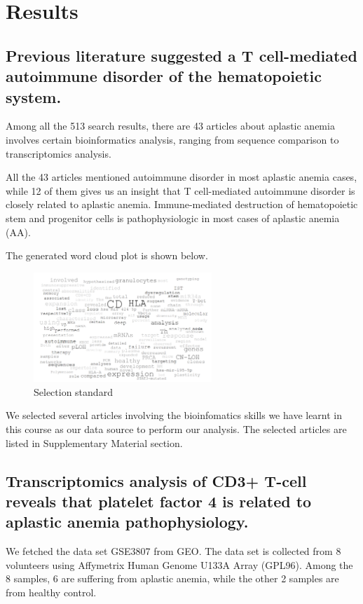 \section{Results}

\subsection{Previous literature suggested a T cell-mediated autoimmune disorder of the hematopoietic system.}

Among all the 513 search results, there are 43 articles about aplastic anemia involves certain bioinformatics analysis, ranging from sequence comparison to transcriptomics analysis. 

All the 43 articles mentioned autoimmune disorder in most aplastic anemia cases, while 12 of them gives us an insight that T cell-mediated autoimmune disorder is closely related to aplastic anemia. Immune-mediated destruction of hematopoietic stem and progenitor cells is pathophysiologic in most cases of aplastic anemia (AA).\cite{zeng2004transcript}

The generated word cloud plot is shown below.

\begin{figure}[H]
    \centering
    \includegraphics[width=0.6\textwidth]{image/wordcloud.png}
    \caption{Selection standard}
    \label{WORD}
\end{figure}

We selected several articles involving the bioinfomatics skills we have learnt in this course as our data source to perform our analysis. The selected articles are listed in Supplementary Material section.


\subsection{Transcriptomics analysis of CD3+ T-cell reveals that platelet factor 4 is related to aplastic anemia pathophysiology.}

We fetched the data set GSE3807 from GEO. The data set is collected from 8 volunteers using Affymetrix Human Genome U133A Array (GPL96). Among the 8 samples, 6 are suffering from aplastic anemia, while the other 2 samples are from healthy control.\cite{franzke2006identification}


